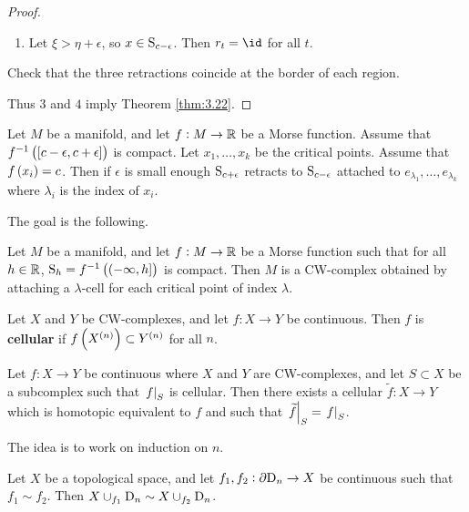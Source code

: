 \begin{proof}
\begin{enumerate}
\begin{enumerate}[label=Case \arabic*., leftmargin=0.5in]
\item Let $ \xi > \eta + \epsilon $, so $ x \in \S_{c - \epsilon} $. Then $ r_t = \id $ for all $ t $.
\end{enumerate}
Check that the three retractions coincide at the border of each region.
\end{enumerate}
Thus $ 3 $ and $ 4 $ imply Theorem \ref{thm:3.22}.
\end{proof}

\begin{remark}
Let $ M $ be a manifold, and let $ f : M \to \RR $ be a Morse function. Assume that $ f^{-1}\br{\sbr{c - \epsilon, c + \epsilon}} $ is compact. Let $ x_1, \dots, x_k $ be the critical points. Assume that $ f\br{x_i} = c $. Then if $ \epsilon $ is small enough $ \S_{c + \epsilon} $ retracts to $ \S_{c - \epsilon} $ attached to $ e_{\lambda_1}, \dots, e_{\lambda_k} $ where $ \lambda_i $ is the index of $ x_i $.
\end{remark}


The goal is the following.

\begin{theorem}
\label{thm:4.12}
Let $ M $ be a manifold, and let $ f : M \to \RR $ be a Morse function such that for all $ h \in \RR $, $ \S_h = f^{-1}\br{\intoc{-\infty, h}} $ is compact. Then $ M $ is a CW-complex obtained by attaching a $ \lambda $-cell for each critical point of index $ \lambda $.
\end{theorem}

\pagebreak

\begin{definition}
Let $ X $ and $ Y $ be CW-complexes, and let $ f : X \to Y $ be continuous. Then $ f $ is \textbf{cellular} if $ f\br{X^{\br{n}}} \subset Y^{\br{n}} $ for all $ n $.
\end{definition}

\begin{theorem}
Let $ f : X \to Y $ be continuous where $ X $ and $ Y $ are CW-complexes, and let $ S \subset X $ be a subcomplex such that $ \eval{f}_S $ is cellular. Then there exists a cellular $ \widetilde{f} : X \to Y $ which is homotopic equivalent to $ f $ and such that $ \eval{\widetilde{f}}_S = \eval{f}_S $.
\end{theorem}

The idea is to work on induction on $ n $.

\begin{theorem}[Whitehead]
Let $ X $ be a topological space, and let $ f_1, f_2 : \partial\D_n \to X $ be continuous such that $ f_1 \sim f_2 $. Then $ X \cup_{f_1} \D_n \sim X \cup_{f_2} \D_n $.
\end{theorem}


